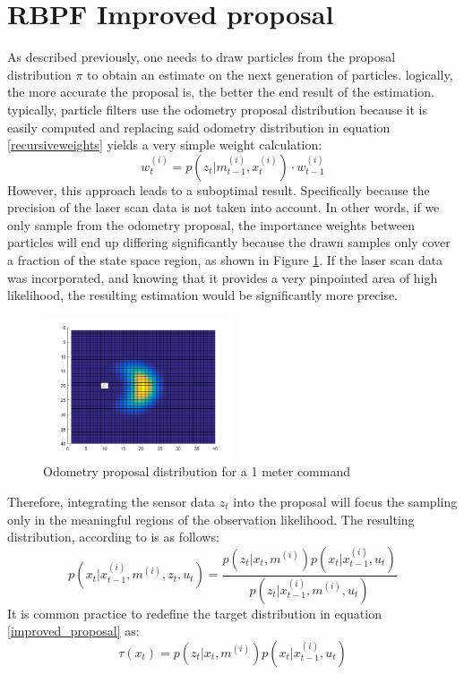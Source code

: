 \documentclass[letterpaper]{article}
\begin{document}
\section{RBPF Improved proposal}
As described previously, one needs to draw particles from the proposal distribution $\pi$ to obtain an estimate on the next generation of particles. logically, the more accurate the proposal is, the better the end result of the estimation. typically, particle filters use the odometry proposal distribution because it is easily computed and replacing said odometry distribution in equation \ref{recursiveweights} yields a very simple weight calculation:
\begin{equation}
w_t^{(i)}= p(z_t|m_{t-1}^{(i)}, x_t^{(i)}) \cdot w_{t-1}^{(i)}
\end{equation}
However, this approach leads to a suboptimal result. Specifically because the precision of the laser scan data is not taken into account. In other words, if we only sample from the odometry proposal, the importance weights between particles will end up differing significantly because the drawn samples only cover a fraction of the state space region, as shown in Figure \ref{odometry_motion_model}. If the laser scan data was incorporated, and knowing that it provides a very pinpointed area of high likelihood, the resulting estimation would be significantly more precise.  
\begin{figure}[h]
	\centering
	\includegraphics[width=0.5\textwidth]{figures/motion_model_odometry}
	\caption{Odometry proposal distribution for a 1 meter command}
	\label{odometry_motion_model}
\end{figure}
Therefore, integrating the sensor data $z_t$ into the proposal will focus the sampling only in the meaningful regions of the observation likelihood. The resulting distribution, according to \cite{optimal_proposal} is as follows: 
\begin{equation}
	\label{improved_proposal}
	p(x_t|x_{t-1}^{(i)}, m^{(i)}, z_t, u_t)=\frac{p(z_t|x_t, m^{(i)})p(x_t|x_{t-1}^{(i)}, u_t)}{p(z_t|x_{t-1}^{(i)}, m^{(i)}, u_t)}
\end{equation}
It is common practice to redefine the target distribution in equation \ref{improved_proposal} as:
\begin{equation*}
\tau (x_t)= p(z_t|x_t, m^{(i)})p(x_t|x_{t-1}^{(i)}, u_t)
\end{equation*} 
\end{document}
